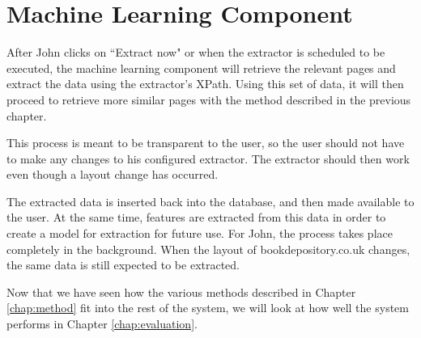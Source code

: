 \section{Machine Learning Component}
After John clicks on ``Extract now" or when the extractor is scheduled to be executed, the
machine learning component will retrieve the relevant pages and extract the data using the
extractor's XPath. Using this set of data, it will then proceed to retrieve more similar pages
with the method described in the previous chapter.

This process is meant to be transparent to the user, so the user should not have to make
any changes to his configured extractor. The extractor should then work even though a layout 
change has occurred.


	The extracted data is inserted back into the database, and then made available to the user.
At the same time, features are extracted from this data in order to create a model for
extraction for future use.  For John, the process takes place completely in the background.
When the layout of bookdepository.co.uk changes, the same data is still expected to be extracted.

	Now that we have seen how the various methods described in Chapter \ref{chap:method} 
fit into the rest of the system, we will look at how well the system performs in 
Chapter \ref{chap:evaluation}.
